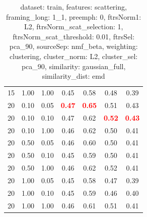 \documentclass[12pt,a4paper,fleqn]{tufte-handout}
\begin{document}
\begin{table}
\begin{center}
\begin{tabular}{lllcccc}
15 & 1.00 & 1.00 & 0.45 & 0.58 & 0.48 & 0.39 \\ 
20 & 0.10 & 0.05 & \textbf{\textcolor{red}{0.47}} & \textbf{\textcolor{red}{0.65}} & 0.51 & 0.43 \\ 
20 & 0.10 & 0.10 & 0.47 & 0.62 & \textbf{\textcolor{red}{0.52}} & \textbf{\textcolor{red}{0.43}} \\ 
20 & 0.10 & 1.00 & 0.46 & 0.62 & 0.50 & 0.41 \\ 
20 & 0.50 & 0.05 & 0.46 & 0.60 & 0.50 & 0.41 \\ 
20 & 0.50 & 0.10 & 0.45 & 0.59 & 0.50 & 0.41 \\ 
20 & 0.50 & 1.00 & 0.46 & 0.62 & 0.52 & 0.41 \\ 
20 & 1.00 & 0.05 & 0.45 & 0.58 & 0.47 & 0.39 \\ 
20 & 1.00 & 0.10 & 0.45 & 0.59 & 0.46 & 0.40 \\ 
20 & 1.00 & 1.00 & 0.46 & 0.61 & 0.51 & 0.41 \\ 
\end{tabular} 
\end{center} 
\caption{dataset: train, features: scattering, framing\_long: 1\_1, preemph: 0, ftrsNorm1: L2, ftrsNorm\_scat\_selection: 1, ftrsNorm\_scat\_threshold: 0.01, ftrsSel: pca\_90, sourceSep: nmf\_beta, weighting: clustering, cluster\_norm: L2, cluster\_sel: pca\_90, similarity: gaussian\_full, similarity\_dist: emd} 
\label{datasetrFeaturscFraminlong1_1Preemp0Ftrsnorm1L2Ftrsnoscatselect1Ftrsnoscatthresh0.01Ftrsselpc90SourcesepnmbeWeightclClustenormL2Clusteselpc90SimilagafuSimiladistem} 
\end{table} 
 
 
 
                                   
                                   
 
\end{document}
